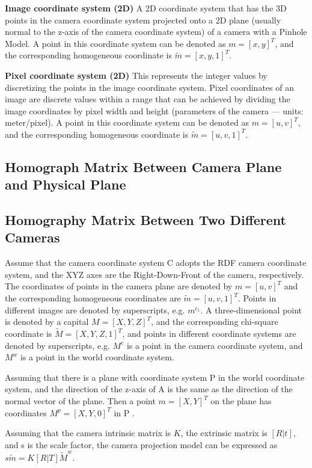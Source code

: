 \textbf{Image coordinate system (2D)} A 2D coordinate system that has the 3D points in the camera
coordinate system projected onto a 2D plane
(usually normal to the z-axis of the camera coordinate system) of a camera with a Pinhole Model.
A point in this coordinate system can be denoted as $m=[x,y]^T$,
and the corresponding homogeneous coordinate is $\widetilde{m}=[x,y,1]^T$.

\textbf{Pixel coordinate system (2D)} This represents the integer values by discretizing the points in the image coordinate system.
Pixel coordinates of an image are discrete values within a range
that can be achieved by dividing the image coordinates by pixel width and height (parameters of the camera — units: meter/pixel).
A point in this coordinate system can be denoted as $m=[u,v]^T$,
and the corresponding homogeneous coordinate is $\widetilde{m}=[u,v,1]^T$.

\subsection{Homograph Matrix Between Camera Plane and Physical Plane}
\label{subsec:Homograph Matrix Between Camera Plane and Physical Plane}


\subsection{Homography Matrix Between Two Different Cameras}
\label{subsec:Homography Matrix Between Two Different Cameras}
Assume that the camera coordinate system C adopts the RDF camera coordinate system,
and the XYZ axes are the Right-Down-Front of the camera, respectively.
The coordinates of points in the camera plane are denoted by $m=[u,v]^T$
and the corresponding homogeneous coordinates are $\widetilde{m}=[u,v,1]^T$.
Points in different images are denoted by superscripts, e.g. $m^{c_1}$.
A three-dimensional point is denoted by a capital $M=[X,Y,Z]^T$,
and the corresponding chi-square coordinate is $\widetilde{M}=[X,Y,Z,1]^T$,
and points in different coordinate systems are denoted by superscripts, e.g.
$M^{c}$ is a point in the camera coordinate system, and $M^{w}$ is a point in the world coordinate system.

Assuming that there is a plane with coordinate system P in the world coordinate system,
and the direction of the z-axis of A is the same as the direction of the normal vector of the plane.
Then a point $m=[X,Y]^T$ on the plane has coordinates $M^p=[X,Y,0]^T$ in P .

Assuming that the camera intrinsic matrix is $K$, the extrinsic matrix is $[R|t]$,
and s is the scale factor, the camera projection model can be expressed as $s\widetilde{m}=K[R|T]\widetilde{M}^w$.